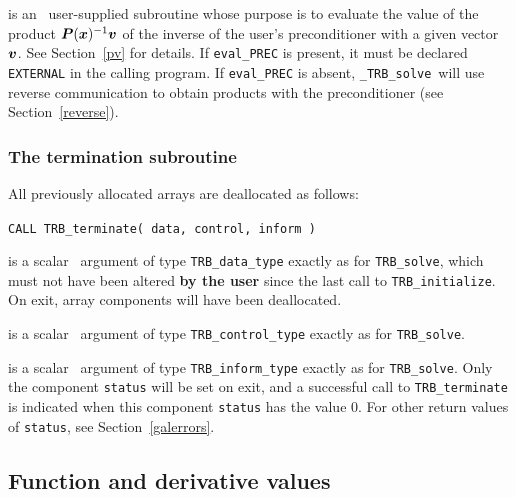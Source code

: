 \documentclass{galahad}
\newcommand{\packagename}{TRB}
\newcommand{\fullpackagename}{\libraryname\_\packagename}
\newcommand{\solver}{{\tt \fullpackagename\_solve}}
\begin{document}
\begin{description}
 is an \optional\
user-supplied subroutine whose purpose is to evaluate the value of the
product ${\bm{P}}({\bm{x}})^{-1}{\bm{v}}$ of the inverse of the user's preconditioner 
with a given vector ${\bm{v}}$. See Section~\ref{pv} for details.
If {\tt eval\_PREC} is present,
it must be declared {\tt EXTERNAL} in the calling program.
If {\tt eval\_PREC} is absent, \solver\ will use reverse communication to
obtain products with the preconditioner (see Section~\ref{reverse}).

\end{description}


\subsubsection{The  termination subroutine}
All previously allocated arrays are deallocated as follows:
\vspace*{1mm}

\hspace{8mm}
{\tt CALL \packagename\_terminate( data, control, inform )}

\vspace*{-1mm}
\begin{description}

 is a scalar \intentinout\ argument of type
{\tt \packagename\_data\_type}
exactly as for
{\tt \packagename\_solve},
which must not have been altered {\bf by the user} since the last call to
{\tt \packagename\_initialize}.
On exit, array components will have been deallocated.

 is a scalar \intentin\ argument of type
{\tt \packagename\_control\_type}
exactly as for
{\tt \packagename\_solve}.

 is a scalar \intentout\ argument of type
{\tt \packagename\_inform\_type}
exactly as for
{\tt \packagename\_solve}.
Only the component {\tt status} will be set on exit, and a
successful call to
{\tt \packagename\_terminate}
is indicated when this  component {\tt status} has the value 0.
For other return values of {\tt status}, see Section~\ref{galerrors}.

\end{description}


\subsection{Function and derivative values\label{fdv}}
\end{document}
